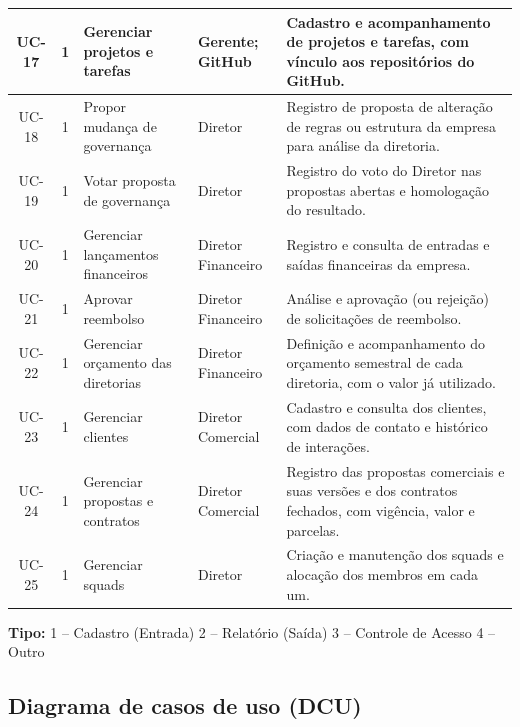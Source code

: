 \begin{center}
\begin{longtable}{|c|c|p{2.9cm}|p{2.4cm}|p{5.3cm}|}
UC-17 & 1 & Gerenciar projetos e tarefas & Gerente; GitHub & Cadastro e acompanhamento de projetos e tarefas, com vínculo aos repositórios do GitHub. \\
\hline

UC-18 & 1 & Propor mudança de governança & Diretor & Registro de proposta de alteração de regras ou estrutura da empresa para análise da diretoria. \\
\hline

UC-19 & 1 & Votar proposta de governança & Diretor & Registro do voto do Diretor nas propostas abertas e homologação do resultado. \\
\hline

UC-20 & 1 & Gerenciar lançamentos financeiros & Diretor Financeiro & Registro e consulta de entradas e saídas financeiras da empresa. \\
\hline

UC-21 & 1 & Aprovar reembolso & Diretor Financeiro & Análise e aprovação (ou rejeição) de solicitações de reembolso. \\
\hline

UC-22 & 1 & Gerenciar orçamento das diretorias & Diretor Financeiro & Definição e acompanhamento do orçamento semestral de cada diretoria, com o valor já utilizado. \\
\hline

UC-23 & 1 & Gerenciar clientes & Diretor Comercial & Cadastro e consulta dos clientes, com dados de contato e histórico de interações. \\
\hline

UC-24 & 1 & Gerenciar propostas e contratos & Diretor Comercial & Registro das propostas comerciais e suas versões e dos contratos fechados, com vigência, valor e parcelas. \\
\hline

UC-25 & 1 & Gerenciar squads & Diretor & Criação e manutenção dos squads e alocação dos membros em cada um. \\
\hline
\end{longtable}
\end{center}

{\footnotesize
\noindent\textbf{Tipo:} 1 -- Cadastro (Entrada) \hfill 2 -- Relatório (Saída) \hfill 3 -- Controle de Acesso \hfill 4 -- Outro\par}

\clearpage

\subsection{Diagrama de casos de uso (DCU)}

